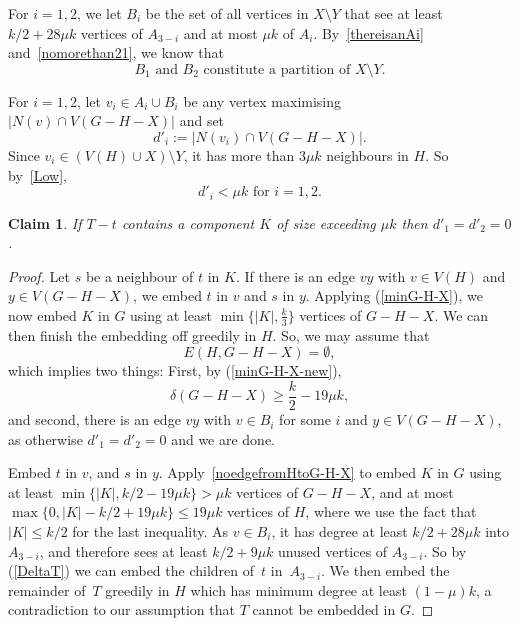 \documentclass[12pt]{article}
\newtheorem{claim}[theorem]{Claim}
\begin{document}
For $i=1,2$, 
we let $B_i$ be the set of all vertices in $X\setminus Y$ that see at least $k/2+28\mu k$ vertices of 
$A_{3-i}$ and at most $\mu k$ of $A_i$.
By~\eqref{thereisanAi} and~\eqref{nomorethan21}, we know that
\begin{equation}\label{B1B2parti}
\text{$B_1$ and $B_2$ constitute a partition of $X\setminus Y$.} \end{equation} 

 

\noindent  For $i=1,2$, let $v_i\in A_i \cup B_i$ be any vertex
maximising $|N(v)\cap V(G-H-X)|$ and set $$d'_i:=|N(v_i)\cap V(G-H-X)|.$$
Since $v_i\in (V(H)\cup X)\setminus Y$, it has more than $3\mu k$ neighbours in $H$. So by~\eqref{Low}, %
\begin{equation}
    \label{d'ismall}
    \text{$d'_i<\mu k$ for $i=1,2$.}
\end{equation}


\begin{claim} 
\label{nobigcomponent2}
If
$T-t$ contains a component $K$ of size exceeding 
$\mu k$ then $d'_1=d'_2=0$. 
\end{claim} 

\begin{proof}
Let $s$ be a neighbour of $t$ in $K$. 
If there is an edge $vy$ with $v\in V(H)$ and $y\in V(G-H-X)$, 
we embed $t$ in $v$ and $s$  in $y$. Applying (\ref{minG-H-X}), we  now embed  $K$ in $G$  using at least 
$\min\{|K|,\frac{k}{3}\}$ vertices of $G-H-X$.  We can then finish the embedding off greedily in $H$.
So, we may assume that $$E(H, G-H-X)=\emptyset,$$ which implies two things: First, by  (\ref{minG-H-X-new}),
\begin{equation}\label{noedgefromHtoG-H-X}
\delta(G-H-X)\ge \frac{k}2-19\mu k,
\end{equation}
 and second,
there is an edge $vy$ with $v\in B_i$ for some $i$ and $y\in V(G-H-X)$, as otherwise $d'_1=d'_2=0$ and we are done. 

Embed $t$ in $v$, and $s$  in $y$. Apply~\eqref{noedgefromHtoG-H-X} to embed  $K$ in $G$   using at least 
$\min\{|K|, k/2-19\mu k\} >\mu k$ vertices of $G-H-X$, and   at most $\max\{0, |K|- k/2+19\mu k\} \le 19\mu k $ vertices of $H$, where we use the fact that $|K|\le k/2$ for the last inequality. As $v\in B_i$, it has degree at least
$k/2+28\mu k$
into $A_{3-i}$, and therefore sees at least $k/2+9\mu k$ unused vertices of $A_{3-i}$.
So by (\ref{DeltaT}) 
we can    embed the 
children of~$t$ in~$A_{3-i}$. We then embed
the remainder of~$T$ greedily in $H$ which has minimum degree at least $(1-\mu)k$, a contradiction to our assumption that $T$ cannot be embedded in $G$.
\end{proof}
\end{document}
